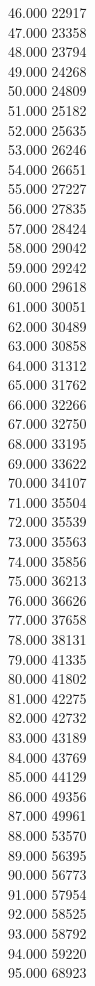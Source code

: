 { 46.000	22917 \\
 47.000	23358 \\
 48.000	23794 \\
 49.000	24268 \\
 50.000	24809 \\
 51.000	25182 \\
 52.000	25635 \\
 53.000	26246 \\
 54.000	26651 \\
 55.000	27227 \\
 56.000	27835 \\
 57.000	28424 \\
 58.000	29042 \\
 59.000	29242 \\
 60.000	29618 \\
 61.000	30051 \\
 62.000	30489 \\
 63.000	30858 \\
 64.000	31312 \\
 65.000	31762 \\
 66.000	32266 \\
 67.000	32750 \\
 68.000	33195 \\
 69.000	33622 \\
 70.000	34107 \\
 71.000	35504 \\
 72.000	35539 \\
 73.000	35563 \\
 74.000	35856 \\
 75.000	36213 \\
 76.000	36626 \\
 77.000	37658 \\
 78.000	38131 \\
 79.000	41335 \\
 80.000	41802 \\
 81.000	42275 \\
 82.000	42732 \\
 83.000	43189 \\
 84.000	43769 \\
 85.000	44129 \\
 86.000	49356 \\
 87.000	49961 \\
 88.000	53570 \\
 89.000	56395 \\
 90.000	56773 \\
 91.000	57954 \\
 92.000	58525 \\
 93.000	58792 \\
 94.000	59220 \\
 95.000	68923 \\
}

